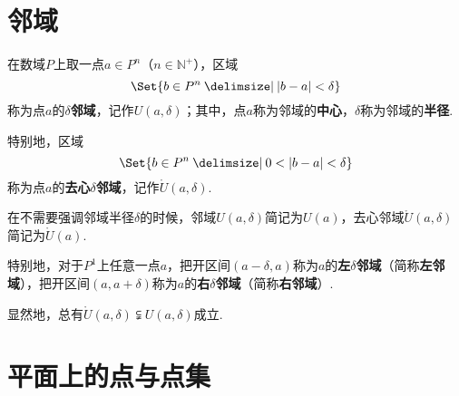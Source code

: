 \section{邻域}
\begin{definition}
在数域\(P\)上取一点\(a \in P^n\)（\(n\in\mathbb{N}^+\)），区域\[
\Set{b \in P^n \given \abs{b - a} < \delta}
\]称为点\(a\)的\(\delta\)\textbf{邻域}，记作\(U(a,\delta)\)；其中，点\(a\)称为邻域的\textbf{中心}，\(\delta\)称为邻域的\textbf{半径}.

特别地，区域\[
\Set{b \in P^n \given 0 < \abs{b - a} < \delta}
\]称为点\(a\)的\textbf{去心\(\delta\)邻域}，记作\(\mathring{U}(a,\delta)\).

在不需要强调邻域半径\(\delta\)的时候，邻域\(U(a,\delta)\)简记为\(U(a)\)，去心邻域\(\mathring{U}(a,\delta)\)简记为\(\mathring{U}(a)\).

特别地，对于\(P^1\)上任意一点\(a\)，把开区间\((a-\delta,a)\)称为\(a\)的\textbf{左\(\delta\)邻域}（简称\textbf{左邻域}），把开区间\((a,a+\delta)\)称为\(a\)的\textbf{右\(\delta\)邻域}（简称\textbf{右邻域}）.
\end{definition}

\begin{property}
显然地，总有\(\mathring{U}(a,\delta) \subsetneqq U(a,\delta)\)成立.
\end{property}

\section{平面上的点与点集}
